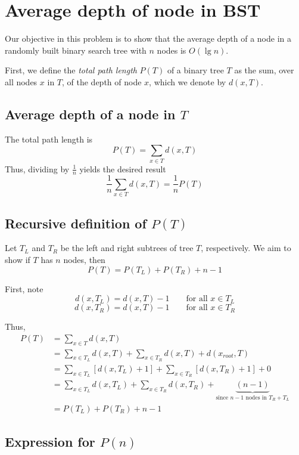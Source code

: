 \documentclass[paper=a4, fontsize=11pt]{scrartcl} %
\numberwithin{equation}{section} %
\numberwithin{figure}{section} %
\numberwithin{table}{section} %
\begin{document}
\section{Average depth of node in BST}

Our objective in this problem is to show that the average depth of a node in a randomly built binary search tree with $n$ nodes is $O(\lg n)$.

First, we define the \emph{total path length} $P(T)$ of a binary tree $T$ as the sum, over all nodes $x$ in $T$, of the depth of node $x$, which we denote by $d(x, T)$.

\subsection{Average depth of a node in $T$}

The total path length is
\[P(T) = \sum_{x \in T} d(x, T)\]
Thus, dividing by $\frac{1}{n}$ yields the desired result
\[\frac{1}{n} \sum_{x \in T} d(x, T) = \frac{1}{n} P(T)\]

\subsection{Recursive definition of $P(T)$}

Let $T_L$ and $T_R$ be the left and right subtrees of tree $T$, respectively. We aim to show if $T$ has $n$ nodes, then
\[P(T) = P(T_L) + P(T_R) + n - 1\]

First, note
\[d(x, T_L) = d(x, T) - 1 \qquad{} \textrm{for all } x \in T_L\]
\[d(x, T_R) = d(x, T) - 1 \qquad{} \textrm{for all } x \in T_R\]

Thus,
\begin{align*}
P(T) &= \sum_{x \in T} d(x, T) \\
	&= \sum_{x \in T_L} d(x, T) + \sum_{x \in T_R} d(x, T) + d(x_{root}, T)\\
	&= \sum_{x \in T_L} [d(x, T_L) + 1] + \sum_{x \in T_R} [d(x, T_R) + 1] + 0\\
	&= \sum_{x \in T_L} d(x, T_L) + \sum_{x \in T_R} d(x, T_R) + \underbrace{(n - 1)}_{\textrm{since } n-1 \textrm{ nodes in } T_R + T_L}\\
	&= P(T_L) + P(T_R) + n - 1
\end{align*}

\subsection{Expression for $P(n)$}
\end{document}
